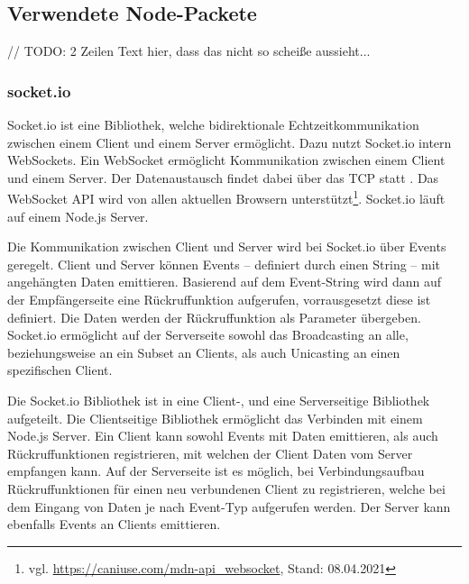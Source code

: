 \subsection{Verwendete Node-Packete}
// TODO: 2 Zeilen Text hier, dass das nicht so scheiße aussieht...

\subsubsection{socket.io}
Socket.io ist eine Bibliothek, welche bidirektionale Echtzeitkommunikation zwischen einem Client und einem Server ermöglicht. Dazu nutzt Socket.io intern WebSockets\cite{socketio}. Ein WebSocket ermöglicht Kommunikation zwischen einem Client und einem Server. Der Datenaustausch findet dabei über das \ac{TCP} statt \cite{websocketRFC}. Das WebSocket \ac{API} wird von allen aktuellen Browsern unterstützt\footnote{vgl. \url{https://caniuse.com/mdn-api_websocket}, Stand: 08.04.2021}. Socket.io läuft auf einem Node.js Server\cite{socketio}.\par

Die Kommunikation zwischen Client und Server wird bei Socket.io über Events geregelt. Client und Server können Events -- definiert durch einen String -- mit angehängten Daten emittieren. Basierend auf dem Event-String wird dann auf der Empfängerseite eine Rückruffunktion aufgerufen, vorrausgesetzt diese ist definiert. Die Daten werden der Rückruffunktion als Parameter übergeben. Socket.io ermöglicht auf der Serverseite sowohl das Broadcasting an alle, beziehungsweise an ein Subset an Clients, als auch Unicasting an einen spezifischen Client.\par

Die Socket.io Bibliothek ist in eine Client-, und eine Serverseitige Bibliothek aufgeteilt. Die Clientseitige Bibliothek ermöglicht das Verbinden mit einem Node.js Server. Ein Client kann sowohl Events mit Daten emittieren, als auch Rückruffunktionen registrieren, mit welchen der Client Daten vom Server empfangen kann. Auf der Serverseite ist es möglich, bei Verbindungsaufbau Rückruffunktionen für einen neu verbundenen Client zu registrieren, welche bei dem Eingang von Daten je nach Event-Typ aufgerufen werden. Der Server kann ebenfalls Events an Clients emittieren.
